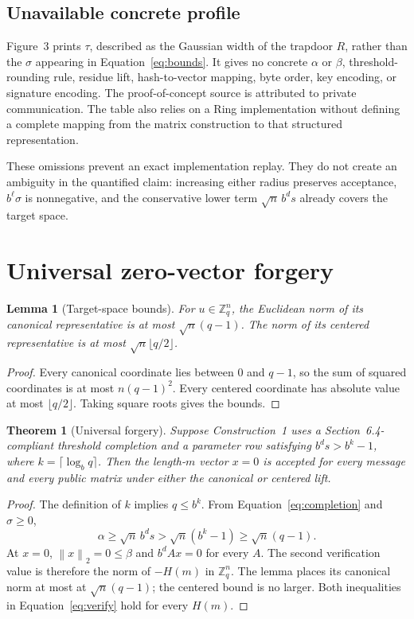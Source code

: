 \documentclass[10pt,a4paper]{article}
\newtheorem{theorem}{Theorem}
\newtheorem{lemma}{Lemma}
\newcommand{\Z}{\mathbb{Z}}
\newcommand{\norm}[1]{\left\lVert #1\right\rVert_2}
\begin{document}
\subsection{Unavailable concrete profile}

Figure~3 prints $\tau$, described as the Gaussian width of the trapdoor $R$,
rather than the $\sigma$ appearing in Equation~\eqref{eq:bounds}. It gives no
concrete $\alpha$ or $\beta$, threshold-rounding rule, residue lift,
hash-to-vector mapping, byte order, key encoding, or signature encoding. The
proof-of-concept source is attributed to private communication. The table
also relies on a Ring implementation without defining a complete mapping from
the matrix construction to that structured representation.

These omissions prevent an exact implementation replay. They do not create
an ambiguity in the quantified claim: increasing either radius preserves
acceptance, $b^\ell\sigma$ is nonnegative, and the conservative lower term
$\sqrt n\,b^d s$ already covers the target space.

\section{Universal zero-vector forgery}

\begin{lemma}[Target-space bounds]
For $u\in\Z_q^n$, the Euclidean norm of its canonical representative is at
most $\sqrt n(q-1)$. The norm of its centered representative is at most
$\sqrt n\lfloor q/2\rfloor$.
\end{lemma}

\begin{proof}
Every canonical coordinate lies between $0$ and $q-1$, so the sum of squared
coordinates is at most $n(q-1)^2$. Every centered coordinate has absolute
value at most $\lfloor q/2\rfloor$. Taking square roots gives the bounds.
\end{proof}

\begin{theorem}[Universal forgery]
Suppose Construction~1 uses a Section~6.4-compliant threshold completion and
a parameter row satisfying $b^d s>b^k-1$, where
$k=\lceil\log_bq\rceil$. Then the length-$m$ vector $x=0$ is accepted for
every message and every public matrix under either the canonical or centered
lift.
\end{theorem}

\begin{proof}
The definition of $k$ implies $q\leq b^k$. From
Equation~\eqref{eq:completion} and $\sigma\geq0$,
\[
 \alpha\geq \sqrt n\,b^d s
          > \sqrt n(b^k-1)
          \geq \sqrt n(q-1).
\]
At $x=0$, $\norm{x}=0\leq\beta$ and $b^dAx=0$ for every $A$. The second
verification value is therefore the norm of $-H(m)$ in $\Z_q^n$. The lemma
places its canonical norm at most at $\sqrt n(q-1)$; the centered bound is no
larger. Both inequalities in Equation~\eqref{eq:verify} hold for every
$H(m)$.
\end{proof}
\end{document}
